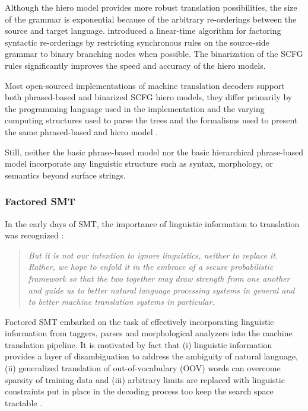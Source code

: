 Although the hiero model provides more robust translation possibilities, the size of the grammar is exponential because of the arbitrary re-orderings between the source and target language. \cite{zhang2006synchronous} introduced a linear-time algorithm for factoring syntactic re-orderings by restricting synchronous rules on the source-side grammar to binary branching nodes when possible. The binarization of the SCFG rules significantly improves the speed and accuracy of the hiero models. 

Most open-sourced implementations of machine translation decoders support both phrased-based and binarized SCFG hiero models, they differ primarily by the programming language used in the implementation and the varying computing structures used to parse the trees and the formalisms used to present the same phrased-based and hiero model \citep{koehn2007moses,hoang2008design,li2009joshua,weese2011joshua,cdec}.

Still, neither the basic phrase-based model nor the basic hierarchical phrase-based model incorporate any linguistic structure such as syntax, morphology, or semantics beyond surface strings.


\subsubsection{Factored SMT}

In the early days of SMT, the importance of linguistic information to translation was recognized \citep{brown1993mathematics}:

\blockquote{\emph{But it is not our intention to ignore linguistics, neither to replace it. Rather, we hope to enfold it in the embrace of a secure probabilistic framework so that the two together may draw strength from one another and guide us to better natural language processing systems in general and to better machine translation systems in particular.}}

Factored SMT embarked on the task of effectively incorporating linguistic information from taggers, parses and morphological analyzers into the machine translation pipeline. It is motivated by fact that (i) linguistic information provides a layer of disambiguation to address the ambiguity of natural language, (ii) generalized translation of out-of-vocabulary (OOV) words can overcome sparsity of training data and (iii) arbitrary limits are replaced with linguistic constraints put in place in the decoding process too keep the search space tractable \citep{Hoang09aunified,koehn2010moreannotations,hoang2011improving}.

